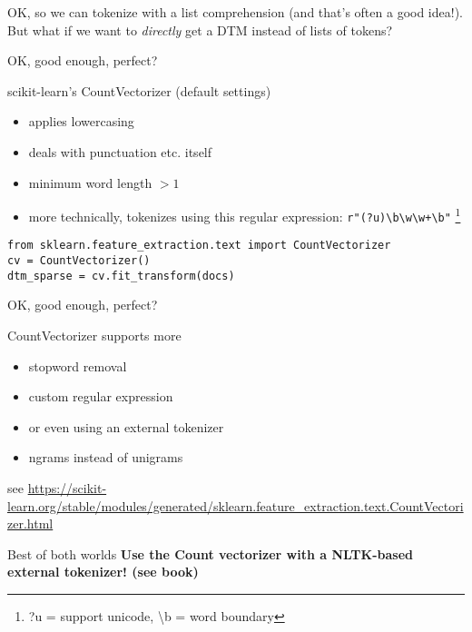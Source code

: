 \begin{frame}[standout]
OK, so we can tokenize with a list comprehension (and that's often a good idea!). But what if we want to \emph{directly} get a DTM instead of lists of tokens?
\end{frame}


\begin{frame}[fragile]{OK, good enough, perfect?}
	\begin{block}{scikit-learn's CountVectorizer (default settings)}
		\begin{itemize}
			\item applies lowercasing
			\item deals with punctuation etc. itself
			\item minimum word length $>1$
			\item more technically, tokenizes using this regular expression: \texttt{r"(?u)\textbackslash b\textbackslash w\textbackslash w+\textbackslash b"} \footnote{?u = support unicode, \textbackslash b = word boundary}
		\end{itemize}
	\end{block}
\begin{lstlisting}
from sklearn.feature_extraction.text import CountVectorizer
cv = CountVectorizer()
dtm_sparse = cv.fit_transform(docs)
\end{lstlisting}
\end{frame}


\begin{frame}{OK, good enough, perfect?}
	\begin{block}{CountVectorizer supports more}
		\begin{itemize}
			\item stopword removal
			\item custom regular expression
			\item or even using an external tokenizer
			\item ngrams instead of unigrams
		\end{itemize}
	\end{block}
			\tiny{see \url{https://scikit-learn.org/stable/modules/generated/sklearn.feature\_extraction.text.CountVectorizer.html}}

\pause
\begin{alertblock}{Best of both worlds}
\textbf{Use the Count vectorizer with a NLTK-based external tokenizer! (see book)}
\end{alertblock}
\end{frame}



